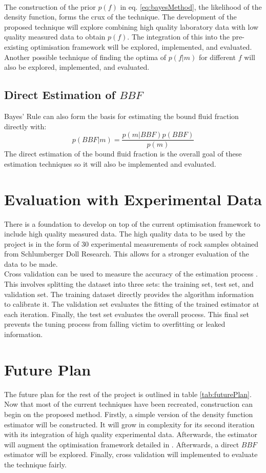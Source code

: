 \paragraph{}
The construction of the prior $p(f)$ in eq. \ref{eq:bayesMethod}, the likelihood of the density function, forms the crux of the technique. The development of the proposed technique will explore combining high quality laboratory data with low quality measured data to obtain $p(f)$. The integration of this into the pre-existing optimisation framework \cite{GruberT2Estimation2013} will be explored, implemented, and evaluated. Another possible technique of finding the optima of $p(f|m)$ for different $f$ will also be explored, implemented, and evaluated.

\subsection{Direct Estimation of $BBF$}
Bayes' Rule can also form the basis for estimating the bound fluid fraction directly with:
\begin{equation}
    p(BBF|m) = \frac{p(m|BBF)p(BBF)}{p(m)}
\end{equation}
The direct estimation of the bound fluid fraction is the overall goal of these estimation techniques so it will also be implemented and evaluated.

\section{Evaluation with Experimental Data}
There is a foundation to develop on top of the current optimisation framework to include high quality measured data. The high quality data to be used by the project is in the form of 30 experimental measurements of rock samples obtained from Schlumberger Doll Research. This allows for a stronger evaluation of the data to be made.
\\
Cross validation can be used to measure the accuracy of the estimation process \cite{crossValidation}. This involves splitting the dataset into three sets: the training set, test set, and validation set. The training dataset directly provides the algorithm information to calibrate it. The validation set evaluates the fitting of the trained estimator at each iteration. Finally, the test set evaluates the overall process. This final set prevents the tuning process from falling victim to overfitting or leaked information.


\section{Future Plan}
The future plan for the rest of the project is outlined in table \ref{tab:futurePlan}. Now that most of the current techniques have been recreated, construction can begin on the proposed method. Firstly, a simple version of the density function estimator will be constructed. It will grow in complexity for its second iteration with its integration of high quality experimental data. Afterwards, the estimator will augment the optimisation framework detailed in \cite{GruberT2Estimation2013}. Afterwards, a direct $BBF$ estimator will be explored. Finally, cross validation will implemented to evaluate the technique fairly.

